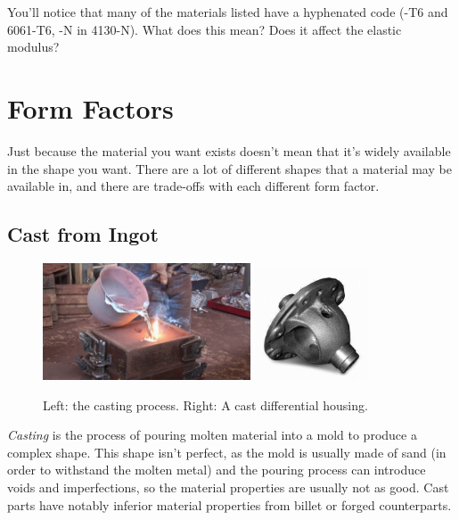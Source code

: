 \addvspace{2.0ex}
\begin{qbox}
	You'll notice that many of the materials listed have a hyphenated code (-T6 and 6061-T6, -N in 4130-N). What does this mean? Does it affect the elastic modulus?
\end{qbox}

 \section{Form Factors}
 
 Just because the material you want exists doesn't mean that it's widely available in the shape you want. There are a lot of different shapes that a material may be available in, and there are trade-offs with each different form factor.
 
 \subsection{Cast from Ingot}
\begin{figure}[H]
	\includegraphics[width=0.55\textwidth]{imgs/casting_proc.jpeg}
	\qquad
	\includegraphics[width=0.3\textwidth]{imgs/casting_part.jpeg}
	\caption{Left: the casting process. Right: A cast differential housing.}
\end{figure} 
 \textit{Casting} is the process of pouring molten material into a mold to produce a complex shape. This shape isn't perfect, as the mold is usually made of sand (in order to withstand the molten metal) and the pouring process can introduce voids and imperfections, so the material properties are usually not as good. Cast parts have notably inferior material properties from billet or forged counterparts.
 
